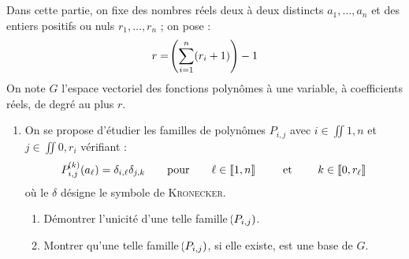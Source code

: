 \documentclass[a4paper,french,bookmarks]{article}
\begin{document}
    \section{}
    
    Dans cette partie, on fixe des nombres réels deux à deux distincts $a_1, \dots, a_n$ et des entiers positifs ou nuls $r_1, \dots, r_n$ ; on pose :
    \[ r = \!\left(\sum_{i=1}^n \!\left(r_i + 1\right)\right) - 1\]
    On note $G$ l'espace vectoriel des fonctions polynômes à une variable, à coefficients réels, de degré au plus $r$.
    
    \begin{enumerate}[resume]
        \item On se propose d'étudier les familles de polynômes $P_{i, j}$ avec $i \in \iint{1, n}$ et $j \in \iint{0, r_i}$ vérifiant :
        \[ P_{i, j}^{\!\left(k\right)}\!\left(a_\ell\right) = \delta_{i, \ell}\delta_{j, k} \qquad\text{pour}\qquad \ell \in \left\llbracket1, n\right\rrbracket \qquad\ \text{et} \ \qquad k \in \left\llbracket0, r_\ell\right\rrbracket \]
        où le $\delta$ désigne le symbole de \textsc{Kronecker}.
        
        \begin{enumerate}
            \item Démontrer l'unicité d'une telle famille $\!\left(P_{i, j}\right)$.
            
            \noafter
            \nobefore\yesafter
            \yesbefore
            
            \item Montrer qu'une telle famille $\!\left(P_{i, j}\right)$, si elle existe, est une base de $G$.
            
            \boxans{
            
}
\end{enumerate}
\end{enumerate}
\end{document}

